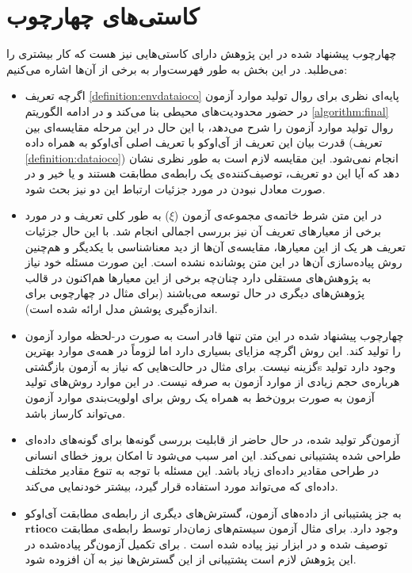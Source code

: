 \section{کاستی‌های چهارچوب}
چهارچوب پیشنهاد شده در این پژوهش دارای کاستی‌هایی نیز هست که کار بیشتری را می‌طلبد. در این بخش به طور فهرست‌وار به برخی از آن‌ها اشاره می‌کنیم:
\begin{itemize}
\item اگرچه تعریف \ref{definition:envdataioco} پایه‌ای نظری برای روال تولید موارد آزمون در حضور محدودیت‌های محیطی بنا می‌کند و در ادامه الگوریتم \ref{algorithm:final} روال تولید موارد آزمون را شرح می‌دهد، با این حال در این مرحله مقایسه‌ای بین قدرت بیان این تعریف از آی‌اوکو با تعریف اصلی آی‌اوکو به همراه داده (تعریف \ref{definition:dataioco}) انجام نمی‌شود. این مقایسه لازم است به طور نظری نشان دهد که آیا این دو تعریف، توصیف‌کننده‌ی یک رابطه‌ی مطابقت هستند و یا خیر و در صورت معادل نبودن در مورد جزئیات ارتباط این دو نیز بحث شود.

\item در این متن شرط خاتمه‌ی مجموعه‌ی آزمون ($\xi$) به طور کلی تعریف و در مورد برخی از معیارهای تعریف آن نیز بررسی اجمالی انجام شد. با این حال جزئیات تعریف هر یک از این معیارها، مقایسه‌ی آن‌ها از دید معناشناسی با یکدیگر و هم‌چنین روش پیاده‌سازی آن‌ها در این متن پوشانده نشده است. این صورت مسئله خود نیاز به پژوهش‌های مستقلی دارد چنان‌چه برخی از این معیارها هم‌اکنون در قالب پژوهش‌های دیگری در حال توسعه می‌باشند (برای مثال در \cite{Briones06} چهارچوبی برای اندازه‌گیری پوشش مدل ارائه شده است).

\item چهارچوب پیشنهاد شده در این متن تنها قادر است به صورت \gls*{در-لحظه} موارد آزمون را تولید کند. این روش اگرچه مزایای بسیاری دارد اما لزوماً در همه‌ی موارد بهترین گزینه نیست. برای مثال در حالت‌هایی که نیاز به \glspl*{آزمون بازگشتی} وجود دارد تولید هرباره‌ی حجم زیادی از موارد آزمون به صرفه نیست. در این موارد روش‌های تولید آزمون به صورت \gls*{برون‌خط} به همراه یک روش برای \gls*{اولویت‌بندی} موارد آزمون می‌تواند کارساز باشد. 

\item آزمون‌گر تولید شده، در حال حاضر از قابلیت \gls*{بررسی گونه‌ها} برای گونه‌های داده‌ای طراحی شده پشتیبانی نمی‌کند. این امر سبب می‌شود تا امکان بروز خطای انسانی در طراحی مقادیر داده‌ای زیاد باشد. این مسئله با توجه به تنوع مقادیر مختلف داده‌ای که می‌تواند مورد استفاده قرار گیرد، بیشتر خودنمایی می‌کند.

\item به جز پشتیبانی از داده‌های آزمون، گسترش‌های دیگری از رابطه‌ی مطابقت آی‌اوکو وجود دارد. برای مثال آزمون سیستم‌های زمان‌دار توسط رابطه‌ی مطابقت $\mathbf{rtioco}$ توصیف شده و در ابزار  نیز پیاده‌ شده است \cite{Larsen04Tron}. برای تکمیل آزمون‌گر پیاده‌شده در این پژوهش لازم است پشتیبانی از این گسترش‌ها نیز به آن افزوده شود.


\end{itemize}

